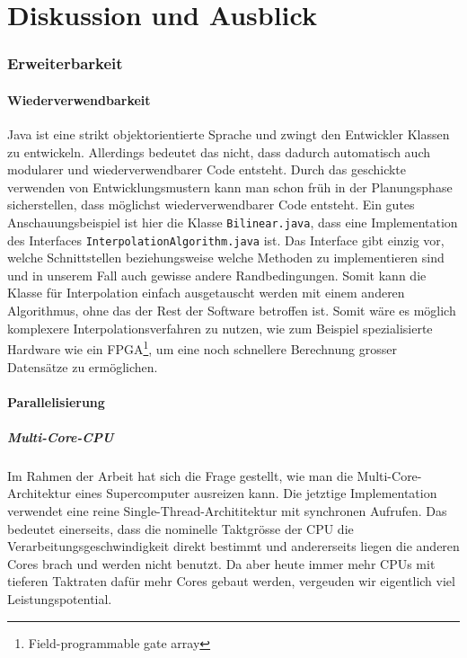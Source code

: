 \part{Diskussion und Ausblick}
\section{Erweiterbarkeit}
\subsection{Wiederverwendbarkeit}
Java ist eine strikt objektorientierte Sprache und zwingt den Entwickler
Klassen zu entwickeln. Allerdings bedeutet das nicht, dass dadurch automatisch
auch modularer und wiederverwendbarer Code entsteht. Durch das geschickte
verwenden von Entwicklungsmustern kann man schon früh in der Planungsphase
sicherstellen, dass möglichst wiederverwendbarer Code entsteht. Ein gutes
Anschauungsbeispiel ist hier die Klasse \texttt{Bilinear.java}, dass eine
Implementation des Interfaces \texttt{InterpolationAlgorithm.java} ist. Das
Interface gibt einzig vor, welche Schnittstellen beziehungsweise welche
Methoden zu implementieren sind und in unserem Fall auch gewisse andere
Randbedingungen. Somit kann die Klasse für Interpolation einfach ausgetauscht
werden mit einem anderen Algorithmus, ohne das der Rest der Software betroffen
ist. Somit wäre es möglich komplexere Interpolationsverfahren zu nutzen, wie
zum Beispiel spezialisierte Hardware wie ein FPGA\footnote{Field-programmable
gate array}, um eine noch schnellere Berechnung grosser Datensätze zu
ermöglichen.

\subsection{Parallelisierung}
\subsubsection{Multi-Core-CPU}
Im Rahmen der Arbeit hat sich die Frage gestellt, wie man die
Multi-Core-Architektur eines Supercomputer ausreizen kann. Die jetztige
Implementation verwendet eine reine Single-Thread-Archititektur mit synchronen
Aufrufen. Das bedeutet einerseits, dass die nominelle Taktgrösse der CPU die
Verarbeitungsgeschwindigkeit direkt bestimmt und andererseits liegen die
anderen Cores brach und werden nicht benutzt. Da aber heute immer mehr CPUs
mit tieferen Taktraten dafür mehr Cores gebaut werden, vergeuden wir
eigentlich viel Leistungspotential.

